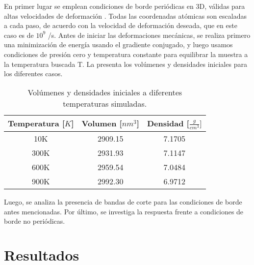 En primer lugar se emplean condiciones de borde periódicas en 3D, válidas para altas velocidades de deformación \citep{bringa05}. Todas las coordenadas atómicas son escaladas a cada paso, de acuerdo con la velocidad de deformación deseada, que en este caso es de $10^9$ /s. Antes de iniciar las deformaciones mecánicas, se realiza primero una minimización de energía usando el gradiente conjugado, y luego usamos condiciones de presión cero y temperatura constante para equilibrar la muestra a la temperatura buscada T. La  presenta los volúmenes y densidades iniciales para los diferentes casos.


\begin{table}[htp]
\begin{center}
\begin{tabular}{*{3}{c}}
\hline
Temperatura [$K$] & Volumen [$nm^{3}$] & Densidad [$\frac{g}{cm^{3}}]$ \\ \hline \hline
10K & 2909.15 & 7.1705 \\ \hline
300K & 2931.93 & 7.1147 \\ \hline
600K & 2959.54 & 7.0484 \\ \hline
900K & 2992.30 & 6.9712 \\ \hline
\end{tabular}
\end{center}
\caption[Volúmenes y densidades iniciales]{Volúmenes y densidades iniciales a diferentes temperaturas simuladas.}
\label{C3:tb:initprops}
\end{table}

Luego, se analiza la presencia de bandas de corte para las condiciones de borde antes mencionadas. Por último, se investiga la respuesta frente a condiciones de borde no periódicas.

\section{Resultados}
\label{S3_3}

